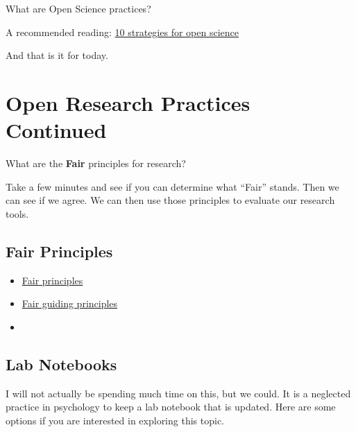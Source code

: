 \documentclass[
  letterpaper,
  DIV=11,
  numbers=noendperiod]{scrreprt}
\providecommand{\tightlist}{%
  \setlength{\itemsep}{0pt}\setlength{\parskip}{0pt}}\usepackage{longtable,booktabs,array}
\begin{document}
What are Open Science practices?

A recommended reading:
\href{https://online.ucpress.edu/collabra/article/8/1/57545/195042/Ten-Strategies-to-Foster-Open-Science-in}{10
strategies for open science}

And that is it for today.


\chapter{Open Research Practices
Continued}\label{open-research-practices-continued}

\begin{tcolorbox}[enhanced jigsaw, opacityback=0, leftrule=.75mm, colback=white, left=2mm, titlerule=0mm, toprule=.15mm, toptitle=1mm, coltitle=black, title=\textcolor{quarto-callout-tip-color}{\faLightbulb}\hspace{0.5em}{Class Question}, opacitybacktitle=0.6, colbacktitle=quarto-callout-tip-color!10!white, breakable, bottomrule=.15mm, bottomtitle=1mm, colframe=quarto-callout-tip-color-frame, arc=.35mm, rightrule=.15mm]

What are the \textbf{Fair} principles for research?

\end{tcolorbox}

Take a few minutes and see if you can determine what ``Fair'' stands.
Then we can see if we agree. We can then use those principles to
evaluate our research tools.

\section{Fair Principles}\label{fair-principles}

\begin{itemize}
\tightlist
\item
  \href{https://www.go-fair.org/fair-principles/}{Fair principles}
\item
  \href{https://www.nature.com/articles/sdata201618}{Fair guiding
  principles}
\item
\end{itemize}

\section{Lab Notebooks}\label{lab-notebooks}

I will not actually be spending much time on this, but we could. It is a
neglected practice in psychology to keep a lab notebook that is updated.
Here are some options if you are interested in exploring this topic.
\end{document}

